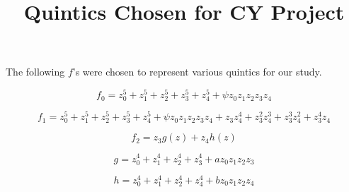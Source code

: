 \documentclass[11pt]{article}
\title{Quintics Chosen for CY Project}
\begin{document}
\maketitle
The following $f$'s were chosen to represent various quintics for our study.

$$f_0 = z_0^5 + z_1^5 + z_2^5 + z_3^5 + z_4^5 + \psi z_0z_1z_2z_3z_4$$

$$f_1 = z_0^5 + z_1^5 + z_2^5 + z_3^5 + z_4^5 + \psi z_0z_1z_2z_3z_4 + z_3z_4^4 + z_3^2z_4^3 + z_3^3z_4^2 + z_3^4z_4$$

$$f_2 = z_3 g(z) + z_4 h(z)$$

$$g = z_0^4 + z_1^4 + z_2^4 + z_3^4 + a z_0z_1z_2z_3$$

$$h = z_0^4 + z_1^4 + z_2^4 + z_4^4 + b z_0z_1z_2z_4$$
\end{document}
